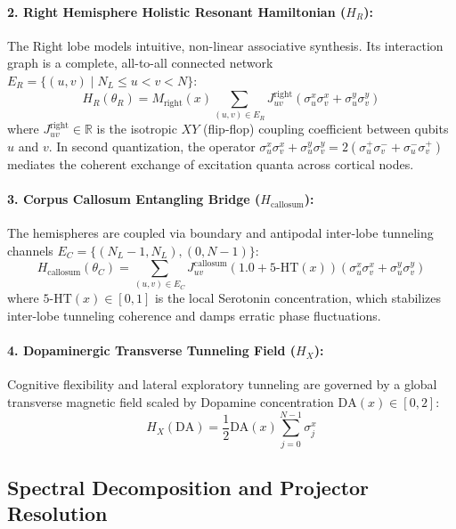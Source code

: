 \documentclass[10pt,twocolumn,3p]{article}
\begin{document}
\paragraph{2. Right Hemisphere Holistic Resonant Hamiltonian ($H_R$):}
The Right lobe models intuitive, non-linear associative synthesis. Its interaction graph is a complete, all-to-all connected network $E_R = \{(u, v) \mid N_L \le u < v < N\}$:
\begin{equation}
    H_R(\theta_R) = M_{\text{right}}(x) \sum_{(u, v) \in E_R} J_{uv}^{\text{right}} \left( \sigma_u^x \sigma_v^x + \sigma_u^y \sigma_v^y \right)
    \label{eq:H_right}
\end{equation}
where $J_{uv}^{\text{right}} \in \mathbb{R}$ is the isotropic $XY$ (flip-flop) coupling coefficient between qubits $u$ and $v$. In second quantization, the operator $\sigma_u^x \sigma_v^x + \sigma_u^y \sigma_v^y = 2(\sigma_u^+ \sigma_v^- + \sigma_u^- \sigma_v^+)$ mediates the coherent exchange of excitation quanta across cortical nodes.

\paragraph{3. Corpus Callosum Entangling Bridge ($H_{\text{callosum}}$):}
The hemispheres are coupled via boundary and antipodal inter-lobe tunneling channels $E_C = \{(N_L - 1, N_L), (0, N - 1)\}$:
\begin{equation}
    H_{\text{callosum}}(\theta_C) = \sum_{(u, v) \in E_C} J_{uv}^{\text{callosum}} \left( 1.0 + \text{5-HT}(x) \right) \left( \sigma_u^x \sigma_v^x + \sigma_u^y \sigma_v^y \right)
    \label{eq:H_callosum}
\end{equation}
where $\text{5-HT}(x) \in [0, 1]$ is the local Serotonin concentration, which stabilizes inter-lobe tunneling coherence and damps erratic phase fluctuations.

\paragraph{4. Dopaminergic Transverse Tunneling Field ($H_X$):}
Cognitive flexibility and lateral exploratory tunneling are governed by a global transverse magnetic field scaled by Dopamine concentration $\text{DA}(x) \in [0, 2]$:
\begin{equation}
    H_X(\text{DA}) = \frac{1}{2} \text{DA}(x) \sum_{j=0}^{N - 1} \sigma_j^x
    \label{eq:H_X}
\end{equation}

\subsection{Spectral Decomposition and Projector Resolution}
\label{subsec:spectral_decomposition}
\end{document}
